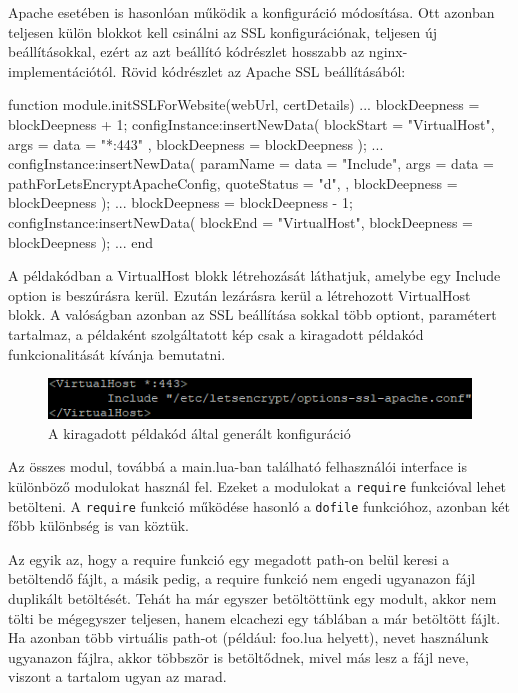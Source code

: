 Apache esetében is hasonlóan működik a konfiguráció módosítása. Ott azonban teljesen külön blokkot kell csinálni az SSL konfigurációnak, teljesen új beállításokkal, ezért az azt beállító kódrészlet hosszabb az nginx-implementációtól. Rövid kódrészlet az Apache SSL beállításából:
\begin{lua}
function module.initSSLForWebsite(webUrl, certDetails)
    ...
    blockDeepness = blockDeepness + 1;
    configInstance:insertNewData({
        blockStart = "VirtualHost",
        args = {
            {data = "*:443"}
        },
        blockDeepness = blockDeepness
    });
    ...
    configInstance:insertNewData({
        paramName = {data = "Include"},
        args = {
            {data = pathForLetsEncryptApacheConfig, quoteStatus = "d"},
        },
        blockDeepness = blockDeepness
    });
    ...
    blockDeepness = blockDeepness - 1;
    configInstance:insertNewData({
        blockEnd = "VirtualHost",
        blockDeepness = blockDeepness
    });
    ...
end
\end{lua}

\pagebreak

A példakódban a VirtualHost blokk létrehozását láthatjuk, amelybe egy Include option is beszúrásra kerül. Ezután lezárásra kerül a létrehozott VirtualHost blokk. A valóságban azonban az SSL beállítása sokkal több optiont, paramétert tartalmaz, a példaként szolgáltatott kép csak a kiragadott példakód funkcionalitását kívánja bemutatni.
\begin{figure}[t]
\centering
\includegraphics[scale=1.0]{images/apache_config_edit_example.png}
\caption{A kiragadott példakód által generált konfiguráció}
\end{figure}


Az összes modul, továbbá a main.lua-ban található felhasználói interface is különböző modulokat használ fel. Ezeket a modulokat a \texttt{require} funkcióval lehet betölteni. A \texttt{require} funkció működése hasonló a \texttt{dofile} funkcióhoz, azonban két főbb különbség is van köztük. 

Az egyik az, hogy a require funkció egy megadott path-on belül keresi a betöltendő fájlt, a másik pedig, a require funkció nem engedi ugyanazon fájl duplikált betöltését. Tehát ha már egyszer betöltöttünk egy modult, akkor nem tölti be mégegyszer teljesen, hanem elcachezi egy táblában a már betöltött fájlt. Ha azonban több virtuális path-ot (például: \texttt{} foo.lua helyett), nevet használunk ugyanazon fájlra, akkor többször is betöltődnek, mivel más lesz a fájl neve, viszont a tartalom ugyan az marad. \cite{require}

